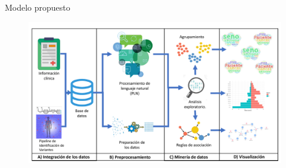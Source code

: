 \documentclass[xcolor=dvipsnames]{beamer}
\begin{document}
\begin{frame}{Modelo propuesto}
\begin{figure}
\includegraphics[width=1\textwidth]{KDDtesis.pdf}
\end{figure}
\end{frame}
\end{document}
